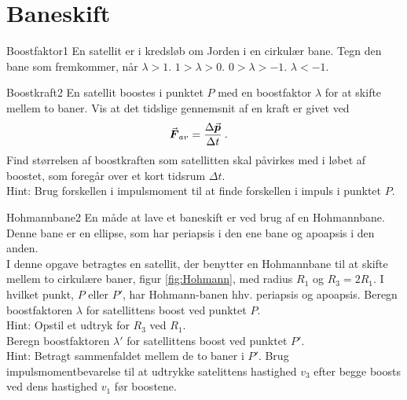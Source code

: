 \section*{Baneskift}
%
%
\begin{opgave}{Boostfaktor}{1}
En satellit er i kredsløb om Jorden i en cirkulær bane. Tegn den bane som fremkommer, når
\opg $\lambda > 1$.
\opg $1 > \lambda > 0$.
\opg $0 > \lambda > -1$.
\opg $\lambda < -1$.
\end{opgave}
%
%
\begin{opgave}{Boostkraft}{2}
En satellit boostes i punktet $P$ med en boostfaktor $\lambda$ for at skifte mellem to baner.
%
\opg Vis at det tidslige gennemsnit af en kraft er givet ved
\begin{align*}
	{\vec{\boldsymbol{F}}}_{av} &= \frac{\Delta {\vec{\boldsymbol{p}}}}{\Delta t} \: .
\end{align*}
%
\opg Find størrelsen af boostkraften som satellitten skal påvirkes med i løbet af boostet, som foregår over et kort tidsrum $\Delta t$.\\
Hint: Brug forskellen i impulsmoment til at finde forskellen i impuls i punktet $P$.
\end{opgave}
%
%
\begin{opgave}{Hohmannbane}{2} \label{opg:Hohmannbane}
En måde at lave et baneskift er ved brug af en Hohmannbane. Denne bane er en ellipse, som har periapsis i den ene bane og apoapsis i den anden.\\
I denne opgave betragtes en satellit, der benytter en Hohmannbane til at skifte mellem to cirkulære baner, figur \ref{fig:Hohmann}, med radius $R_1$ og $R_3 = 2R_1$.
%
\opg I hvilket punkt, $P$ eller $P'$, har Hohmann-banen hhv. periapsis og apoapsis.
%
\opg Beregn boostfaktoren $\lambda$ for satellittens boost ved punktet $P$.\\
Hint: Opstil et udtryk for $R_3$ ved $R_1$.\\
%
\opg Beregn boostfaktoren $\lambda'$ for satellittens boost ved punktet $P'$.\\
Hint: Betragt sammenfaldet mellem de to baner i $P'$.
%
\opg Brug impulsmomentbevarelse til at udtrykke satelittens hastighed $v_3$ efter begge boosts ved dens hastighed $v_1$ før boostene.
\end{opgave}
%
%
